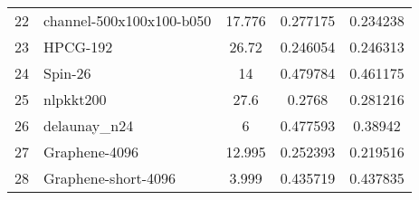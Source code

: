 \begin{tabular}{|l|l|S[round-mode=places,round-precision=2]|S[round-mode=places,round-precision=4]|S[round-mode=places,round-precision=4]|}
{22}	& {	channel-500x100x100-b050  }	& 17.776	& 0.277175	& 0.234238	\\
{23}	& {	HPCG-192                  }	& 26.72	& 0.246054	& 0.246313	\\
{24}	& {	Spin-26                   }	& 14	& 0.479784	& 0.461175	\\
{25}	& {	nlpkkt200                 }	& 27.6	& 0.2768	& 0.281216	\\
{26}	& {	delaunay\_n24              }	& 6	& 0.477593	& 0.38942	\\
{27}	& {	Graphene-4096             }	& 12.995	& 0.252393	& 0.219516	\\
{28}	& {	Graphene-short-4096       }	& 3.999	& 0.435719	& 0.437835	\\
\bottomrule
\end{tabular}


